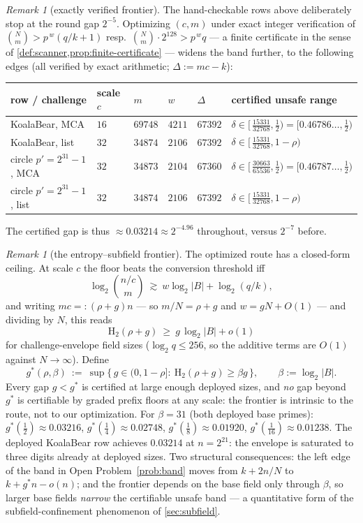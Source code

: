 \documentclass[11pt]{article}
\theoremstyle{definition}
\theoremstyle{remark}
\newtheorem{remark}[theorem]{Remark}
\newcommand{\B}{B}
\newcommand{\Hb}{\mathrm{H}_2}
\begin{document}
\begin{remark}[exactly verified frontier]\label{rem:exact-frontier}
The hand-checkable rows above deliberately stop at the round gap $2^{-5}$. Optimizing $(c,m)$ under exact integer verification of $\binom{N}{m}>p^{\,w}(q/k+1)$ resp.\ $\binom Nm\cdot2^{128}>p^{\,w}q$ --- a finite certificate in the sense of \cref{def:scanner,prop:finite-certificate} --- widens the band further, to the following edges (all verified by exact arithmetic; $\Delta:=mc-k$):
\begin{center}\footnotesize
\begin{tabular}{@{}llllll@{}}
\toprule
row / challenge & scale $c$ & $m$ & $w$ & $\Delta$ & certified unsafe range \\
\midrule
KoalaBear, MCA & $16$ & $69748$ & $4211$ & $67392$ & $\delta\in[\,\tfrac{15331}{32768},\tfrac12)=[0.46786\ldots,\tfrac12)$ \\
KoalaBear, list & $32$ & $34874$ & $2106$ & $67392$ & $\delta\in[\,\tfrac{15331}{32768},1-\rho)$ \\
circle $p'{=}2^{31}{-}1$, MCA & $32$ & $34873$ & $2104$ & $67360$ & $\delta\in[\,\tfrac{30663}{65536},\tfrac12)=[0.46787\ldots,\tfrac12)$ \\
circle $p'{=}2^{31}{-}1$, list & $32$ & $34874$ & $2106$ & $67392$ & $\delta\in[\,\tfrac{15331}{32768},1-\rho)$ \\
\bottomrule
\end{tabular}
\end{center}
The certified gap is thus $\approx0.03214\approx2^{-4.96}$ throughout, versus $2^{-7}$ before.
\end{remark}

\begin{remark}[the entropy--subfield frontier]\label{rem:entropy-frontier}
The optimized route has a closed-form ceiling. At scale $c$ the floor beats the conversion threshold iff
\[
\log_2\binom{n/c}{m}\ \gtrsim\ w\log_2|\B|+\log_2(q/k),
\]
and writing $mc=:(\rho+g)n$ --- so $m/N=\rho+g$ and $w=gN+O(1)$ --- and dividing by $N$, this reads
\[
\Hb(\rho+g)\ \ge\ g\,\log_2|\B|+o(1)
\]
for challenge-envelope field sizes ($\log_2q\le256$, so the additive terms are $O(1)$ against $N\to\infty$). Define
\[
g^*(\rho,\beta)\ :=\ \sup\bigl\{\,g\in(0,1-\rho]:\ \Hb(\rho+g)\ge\beta g\,\bigr\},
\qquad
\beta:=\log_2|\B| .
\]
Every gap $g<g^*$ is certified at large enough deployed sizes, and \emph{no} gap beyond $g^*$ is certifiable by graded prefix floors at any scale: the frontier is intrinsic to the route, not to our optimization. For $\beta=31$ (both deployed base primes): $g^*(\tfrac12)\approx0.03216$, $g^*(\tfrac14)\approx0.02748$, $g^*(\tfrac18)\approx0.01920$, $g^*(\tfrac1{16})\approx0.01238$. The deployed KoalaBear row achieves $0.03214$ at $n=2^{21}$: the envelope is saturated to three digits already at deployed sizes. Two structural consequences: the left edge of the band in Open Problem~\ref{prob:band} moves from $k+2n/N$ to $k+g^*n-o(n)$; and the frontier depends on the base field only through $\beta$, so larger base fields \emph{narrow} the certifiable unsafe band --- a quantitative form of the subfield-confinement phenomenon of \cref{sec:subfield}.
\end{remark}
\end{document}
